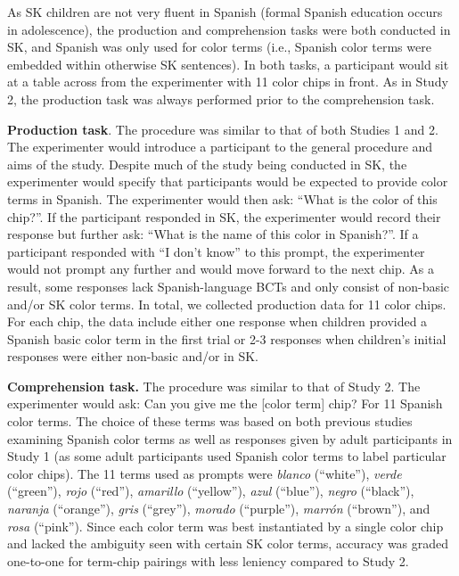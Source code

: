 \documentclass[
  english,
  ,man,floatsintext]{apa6}
\begin{document}
As SK children are not very fluent in Spanish (formal Spanish education occurs in adolescence), the production and comprehension tasks were both conducted in SK, and Spanish was only used for color terms (i.e., Spanish color terms were embedded within otherwise SK sentences). In both tasks, a participant would sit at a table across from the experimenter with 11 color chips in front. As in Study 2, the production task was always performed prior to the comprehension task.

\textbf{Production task}. The procedure was similar to that of both Studies 1 and 2. The experimenter would introduce a participant to the general procedure and aims of the study. Despite much of the study being conducted in SK, the experimenter would specify that participants would be expected to provide color terms in Spanish. The experimenter would then ask: \enquote{What is the color of this chip?}. If the participant responded in SK, the experimenter would record their response but further ask: \enquote{What is the name of this color in Spanish?}. If a participant responded with \enquote{I don't know} to this prompt, the experimenter would not prompt any further and would move forward to the next chip. As a result, some responses lack Spanish-language BCTs and only consist of non-basic and/or SK color terms. In total, we collected production data for 11 color chips. For each chip, the data include either one response when children provided a Spanish basic color term in the first trial or 2-3 responses when children's initial responses were either non-basic and/or in SK.

\textbf{Comprehension task.} The procedure was similar to that of Study 2. The experimenter would ask: Can you give me the {[}color term{]} chip? For 11 Spanish color terms. The choice of these terms was based on both previous studies examining Spanish color terms as well as responses given by adult participants in Study 1 (as some adult participants used Spanish color terms to label particular color chips). The 11 terms used as prompts were \emph{blanco} (\enquote{white}), \emph{verde} (\enquote{green}), \emph{rojo} (\enquote{red}), \emph{amarillo} (\enquote{yellow}), \emph{azul} (\enquote{blue}), \emph{negro} (\enquote{black}), \emph{naranja} (\enquote{orange}), \emph{gris} (\enquote{grey}), \emph{morado} (\enquote{purple}), \emph{marrón} (\enquote{brown}), and \emph{rosa} (\enquote{pink}). Since each color term was best instantiated by a single color chip and lacked the ambiguity seen with certain SK color terms, accuracy was graded one-to-one for term-chip pairings with less leniency compared to Study 2.
\end{document}
